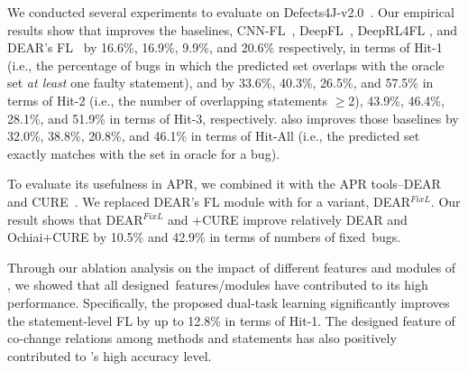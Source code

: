 We conducted several experiments to evaluate {\tool} on
Defects4J-v2.0~\cite{defects4j}. Our empirical results show that
{\tool} improves the baselines, CNN-FL~\cite{zhang2019cnn},
DeepFL~\cite{DeepFL}, DeepRL4FL \cite{icse21-fl}, and DEAR's
FL~\cite{icse22} by 16.6\%, 16.9\%, 9.9\%, and 20.6\% respectively, in
terms of Hit-1 (i.e., the percentage of bugs in which the predicted
set overlaps with the oracle set {\em at least} one faulty statement),
and by 33.6\%, 40.3\%, 26.5\%, and 57.5\% in terms of Hit-2
(i.e., the number of overlapping statements $\geq$2), 43.9\%, 46.4\%,
28.1\%, and 51.9\% in terms of Hit-3, respectively.
{\tool} also improves those baselines by 32.0\%, 38.8\%, 20.8\%, and
46.1\% in terms of Hit-All (i.e., the predicted set exactly matches
with the set in oracle for a bug).
%
%

To evaluate its usefulness in APR, we combined it with the APR
tools--DEAR~\cite{icse22} and CURE~\cite{cure-icse21}. We replaced
DEAR's FL module with {\tool} for a variant, DEAR$^{FixL}$. Our result
shows that DEAR$^{FixL}$ and {\tool}+CURE improve relatively DEAR and
Ochiai+CURE by 10.5\% and 42.9\% in terms of numbers of fixed~bugs.



Through our ablation analysis on the impact of different features and
modules of {\tool}, we showed that all designed~features/modules have
contributed to its high performance. Specifically, the proposed
dual-task learning significantly improves the statement-level FL by up
to 12.8\% in terms of Hit-1. The designed feature of co-change
relations among methods and statements has also positively contributed
to {\tool}'s high accuracy level.


